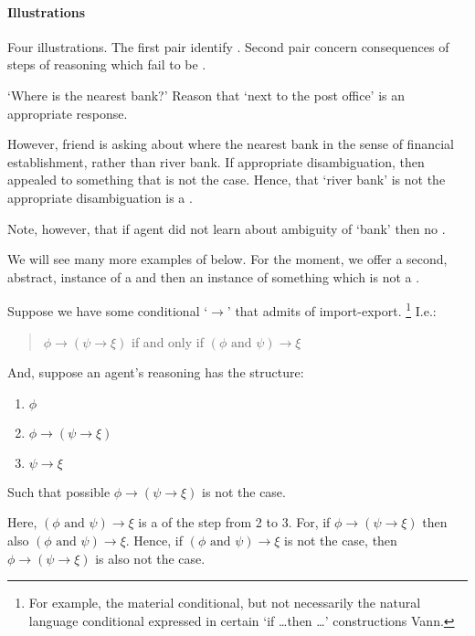 \paragraph{Illustrations}

\begin{note}
  Four illustrations.
  The first pair identify .
  Second pair concern consequences of steps of reasoning which fail to be .
\end{note}

\begin{note}
  \begin{illustration}
    \label{illu:requ:bank}
    `Where is the nearest bank?'
    Reason that `next to the post office' is an appropriate response.
  \end{illustration}
  However, friend is asking about where the nearest bank in the sense of financial establishment, rather than river bank.
  If appropriate disambiguation, then appealed to something that is not the case.
  Hence, that `river bank' is not the appropriate disambiguation is a \requ{}.

  Note, however, that if agent did not learn about ambiguity of `bank' then no \requ{}.
\end{note}

\begin{note}
  We will see many more examples of  below.
  For the moment, we offer a second, abstract, instance of a \requ{} and then an instance of something which is not a \requ{}.
\end{note}

\begin{note}
  \begin{illustration}
    \label{illu:requ:import-export}
    Suppose we have some conditional `\(\rightarrow\)' that admits of import-export.\nolinebreak
    \footnote{
      For example, the material conditional, but not necessarily the natural language conditional expressed in certain `if \dots then \dots' constructions {\color{red} Vann}.
    }
    I.e.:
    \begin{quote}
      \(\phi \rightarrow (\psi \rightarrow \xi)\) if and only if \((\phi \text{ and } \psi) \rightarrow \xi\)
    \end{quote}
    And, suppose an agent's reasoning has the structure:
    \begin{enumerate}
    \item \(\phi\)
    \item \(\phi \rightarrow (\psi \rightarrow \xi)\)
    \item \(\psi \rightarrow \xi\)
    \end{enumerate}
    Such that possible \(\phi \rightarrow (\psi \rightarrow \xi)\) is not the case.
  \end{illustration}

  Here, \((\phi \text{ and } \psi) \rightarrow \xi\) is a \prequ{} of the step from 2 to 3.
  For, if \(\phi \rightarrow (\psi \rightarrow \xi)\) then also \((\phi \text{ and } \psi) \rightarrow \xi\).
  Hence, if \((\phi \text{ and } \psi) \rightarrow \xi\) is not the case, then \(\phi \rightarrow (\psi \rightarrow \xi)\) is also not the case.
\end{note}

